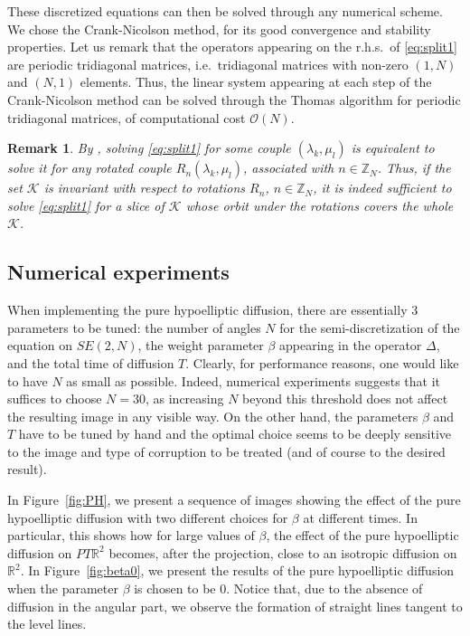 \documentclass[proc]{edpsmath}
\newtheorem{remark}[theorem]{Remark}
\begin{document}
These discretized equations can then be solved through any numerical scheme.
We chose the Crank-Nicolson method, for its good convergence and stability properties.
Let us remark that the operators appearing on the r.h.s.\ of \eqref{eq:split1} are periodic tridiagonal matrices, i.e.\ tridiagonal matrices with non-zero $(1,N)$ and $(N,1)$ elements.
Thus, the linear system appearing at each step of the Crank-Nicolson method can be solved through the Thomas algorithm for periodic tridiagonal matrices, of computational cost $\mathcal{O}(N)$.

\begin{remark}
  \label{rmk:simmetry}
  By \cite[Theorem~2]{Remizov2013}, solving \eqref{eq:split1} for some couple $(\lambda_k,\mu_l)$ is equivalent to solve it for any rotated couple $R_n(\lambda_k,\mu_l)$, associated with $n\in\mathbb Z_N$.
  Thus, if the set $\mathcal K$ is invariant with respect to rotations $R_{n}$, $n\in \mathbb Z_N$, it is indeed sufficient to solve \eqref{eq:split1} for a slice of $\mathcal K$ whose orbit under the rotations covers the whole $\mathcal K$.
\end{remark}


\subsection{Numerical experiments}

When implementing the pure hypoelliptic diffusion, there are essentially 3 parameters to be tuned: the number of angles $N$ for the semi-discretization of the equation on $SE(2,N)$, the weight parameter $\beta$ appearing in the operator $\Delta$, and the total time of diffusion $T$.
Clearly, for performance reasons, one would like to have $N$ as small as possible. Indeed, numerical experiments suggests that it suffices to choose $N=30$, as increasing $N$ beyond this threshold does not affect the resulting image in any visible way. On the other hand, the parameters $\beta$ and $T$ have to be tuned by hand and the optimal choice seems to be deeply sensitive to the image and type of corruption to be treated (and of course to the desired result).

In Figure~\ref{fig:PH}, we present a sequence of images showing the effect of the pure hypoelliptic diffusion with two different choices for $\beta$ at different times.
In particular, this shows how for large values of $\beta$, the effect of the pure hypoelliptic diffusion on $PT\mathbb R^2$ becomes, after the projection, close to an isotropic diffusion on $\mathbb R^2$.
In Figure~\ref{fig:beta0}, we present the results of the pure hypoelliptic diffusion when the parameter $\beta$ is chosen to be $0$. Notice that, due to the absence of diffusion in the angular part, we observe the formation of straight lines tangent to the level lines.
\end{document}
